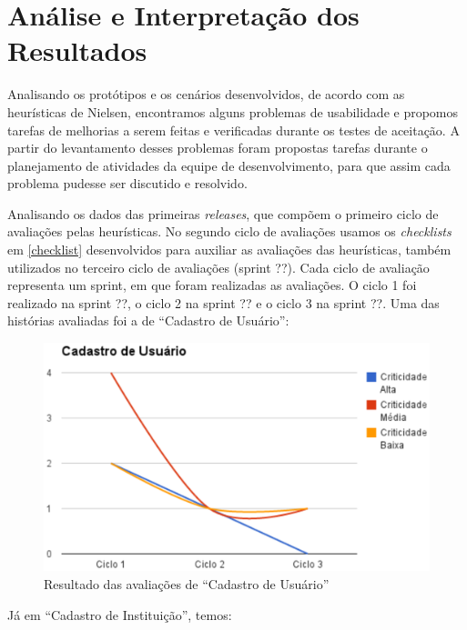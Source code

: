 \section{Análise e Interpretação dos Resultados}
\label{analise}
Analisando os protótipos e os cenários desenvolvidos, de acordo com as heurísticas de Nielsen, encontramos alguns problemas de usabilidade e propomos tarefas de melhorias a serem feitas e verificadas durante os testes de aceitação.
%
A partir do levantamento desses problemas foram propostas tarefas durante o planejamento de atividades da equipe de desenvolvimento, para que assim cada problema pudesse ser discutido e resolvido.

Analisando os dados das primeiras \textit{releases}, que compõem o primeiro ciclo de avaliações pelas heurísticas. No segundo ciclo de avaliações usamos os \textit{checklists} em \ref{checklist} desenvolvidos para auxiliar as avaliações das heurísticas, também utilizados no terceiro ciclo de avaliações (sprint ??). Cada ciclo de avaliação representa um sprint, em que foram realizadas as avaliações. O ciclo 1 foi realizado na sprint ??, o ciclo 2 na sprint ?? e o ciclo 3 na sprint ??. Uma das histórias avaliadas foi a de ``Cadastro de Usuário'':
\begin{figure}[h!]
    	\centering
    	\includegraphics[keepaspectratio=true,scale=0.62]
      		{figuras/graf01.eps}
    	\caption{Resultado das avaliações de ``Cadastro de Usuário''}
    	\label{avaliacaouser}
\end{figure}

Já em ``Cadastro de Instituição'', temos:


